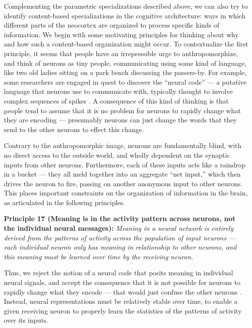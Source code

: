 \documentclass[11pt,twoside]{article}
\begin{document}
Complementing the parametric specializations described above, we can also try to identify content-based specializations in the cognitive architecture: ways in which different parts of the neocortex are organized to process specific kinds of information.  We begin with some motivating principles for thinking about why and how such a content-based organization might occur.  To contextualize the first principle, it seems that people have an irrepressible urge to anthropomorphize, and think of neurons as tiny people, communicating using some kind of language, like two old ladies sitting on a park bench discussing the passers-by.  For example, some researchers are engaged in quest to discover the ``neural code'' --- a putative language that neurons use to communicate with, typically thought to involve complex sequences of spikes \cite{BialekSpikes}.  A consequence of this kind of thinking is that people tend to assume that it is no problem for neurons to rapidly change what they are encoding \cite[e.g.,]{Miller00,Duncan01} --- presumably neurons can just change the words that they send to the other neurons to effect this change.   

Contrary to the anthropomorphic image, neurons are fundamentally blind, with no direct access to the outside world, and wholly dependent on the synaptic inputs from other neurons.  Furthermore, each of these inputs acts like a raindrop in a bucket --- they all meld together into an aggregate ``net input,'' which then drives the neuron to fire, passing on another anonymous input to other neurons.  This places important constraints on the organization of information in the brain, as articulated in the following principles.

{\bf Principle 17 (Meaning is in the activity pattern across neurons, not the individual neural messages):} {\em  Meaning in a neural network is entirely derived from the patterns of activity across the population of input neurons --- each individual neuron only has meaning in relationship to other neurons, and this meaning must be learned over time by the receiving neuron.}

Thus, we reject the notion of a neural code that posits meaning in individual neural signals, and accept the consequence that it is not possible for neurons to rapidly change what they encode --- that would just confuse the other neurons \cite{OReilly10}.  Instead, neural representations must be relatively stable over time, to enable a given receiving neuron to properly learn the statistics of the patterns of activity over its inputs.
\end{document}
